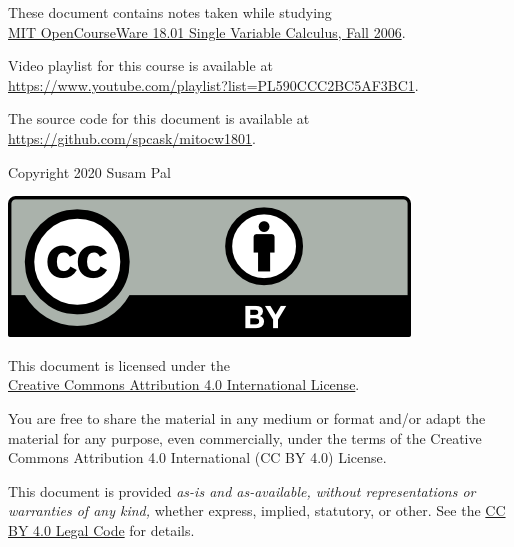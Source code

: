 \maketitle
\pagebreak

\newcommand{\texurl}{https://github.com/spcask/mitocw1801}
\newcommand{\ocwurl}{https://ocw.mit.edu/courses/mathematics/18-01-single-variable-calculus-fall-2006/}
\newcommand{\vidurl}{https://www.youtube.com/playlist?list=PL590CCC2BC5AF3BC1}
\newcommand{\ccbyurl}{http://creativecommons.org/licenses/by/4.0/}
\newcommand{\ccbylcurl}{https://creativecommons.org/licenses/by/4.0/legalcode}
\newcommand{\mitlurl}{https://opensource.org/licenses/MIT}
These document contains notes taken while studying \\
\href{\ocwurl}{MIT OpenCourseWare 18.01 Single Variable Calculus, Fall
2006}.

Video playlist for this course is available at \\
\url{\vidurl}.

The source code for this document is available at \\
\url{\texurl}.

\vspace{20mm}
Copyright \textcopyright{} 2020 Susam Pal

\href{\ccbyurl}{\includegraphics{ccby}}

This document is licensed under the\\
\href{\ccbyurl}{Creative Commons Attribution 4.0 International License}.

You are free to share the material in any medium or format and/or adapt
the material for any purpose, even commercially, under the terms of the
Creative Commons Attribution 4.0 International (CC BY 4.0) License.

This document is provided \emph{as-is and as-available, without
representations or warranties of any kind,} whether express, implied,
statutory, or other. See the
\href{\ccbylcurl}{CC BY 4.0 Legal Code} for details.
\pagebreak

\tableofcontents
